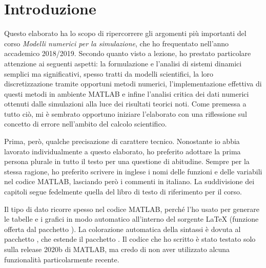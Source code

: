 \graphicspath{{./figures/capitolo1/}}
\lstset{inputpath = ./programs/capitolo1}

\chapter{Introduzione}

Questo elaborato ha lo scopo di ripercorrere
gli argomenti più importanti del corso
\emph{Modelli numerici per la simulazione}, che ho frequentato
nell'anno accademico 2018/2019.
Secondo quanto visto a lezione, ho prestato 
particolare attenzione ai seguenti aspetti:
la formulazione e l'analisi di sistemi dinamici semplici ma significativi,
spesso tratti da modelli scientifici,
la loro discretizzazione tramite opportuni metodi numerici,
l'implementazione effettiva di questi metodi in ambiente MATLAB
e infine l'analisi critica dei dati numerici ottenuti dalle simulazioni
alla luce dei risultati teorici noti.
Come premessa a tutto ciò, mi è sembrato opportuno iniziare
l'elaborato con una riflessione sul concetto di errore nell'ambito
del calcolo scientifico.

Prima, però, qualche precisazione di carattere tecnico.
Nonostante io abbia lavorato individualmente a questo elaborato,
ho preferito adottare la prima persona plurale in tutto il testo
per una questione di abitudine.
Sempre per la stessa ragione, ho preferito scrivere in inglese
i nomi delle funzioni e delle variabili nel codice MATLAB,
lasciando però i commenti in italiano.
La suddivisione dei capitoli segue fedelmente quella
del libro di testo di riferimento per il corso.

Il tipo di dato  ricorre spesso nel codice MATLAB,
perché l'ho usato per generare le tabelle e i grafici in modo automatico
all'interno del sorgente LaTeX (funzione offerta dal pacchetto ).
La colorazione automatica della sintassi è dovuta al
pacchetto , che estende il pacchetto .
Il codice che ho scritto è stato testato solo sulla release 2020b
di MATLAB, ma credo di non aver utilizzato alcuna funzionalità
particolarmente recente.

